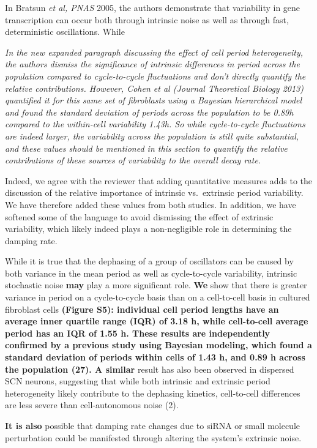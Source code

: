 \documentclass[11pt, letterpaper]{article}
\newenvironment{reviewer}{\itshape\color{gray}}{}
\newenvironment{manuscript}[1]{\begin{center}\begin{tcolorbox}[colback=green!5!white,colframe=green!75!black,width=\textwidth,title={#1},breakable,fonttitle=\bfseries]}{\end{tcolorbox}\end{center}}
\begin{document}
In Bratsun {\itshape et al, PNAS} 2005, the authors demonstrate that variability in gene transcription can occur both through intrinsic noise as well as through fast, deterministic oscillations. While 

\begin{reviewer}
In the new expanded paragraph discussing the effect of cell period heterogeneity, the authors dismiss the significance of intrinsic differences in period across the population compared to cycle-to-cycle fluctuations and don't directly quantify the relative contributions. However, Cohen et al (Journal Theoretical Biology 2013) quantified it for this same set of fibroblasts using a Bayesian hierarchical model and found the standard deviation of periods across the population to be 0.89h compared to the within-cell variability 1.43h. So while cycle-to-cycle fluctuations are indeed larger, the variability across the population is still quite substantial, and these values should be mentioned in this section to quantify the relative contributions of these sources of variability to the overall decay rate.
\end{reviewer}

Indeed, we agree with the reviewer that adding quantitative measures adds to the discussion of the relative importance of intrinsic vs.\ extrinsic period variability. We have therefore added these values from both studies. In addition, we have softened some of the language to avoid dismissing the effect of extrinsic variability, which likely indeed plays a non-negligible role in determining the damping rate.

\begin{manuscript}{Page 6}
  While it is true that the dephasing of a group of oscillators can be caused by both variance in the mean period as well as cycle-to-cycle variability, intrinsic stochastic noise {\bf may} play a more significant role. 
{\bf We} show that there is greater variance in period on a cycle-to-cycle basis than on a cell-to-cell basis in cultured fibroblast cells {\bf (Figure S5): individual cell period lengths have an average inner quartile range (IQR) of 3.18 h, while cell-to-cell average period has an IQR of 1.55 h. 
These results are independently confirmed by a previous study using Bayesian modeling, which found a standard deviation of periods within cells of 1.43 h, and 0.89 h across the population (27). 
A similar} result has also been observed in dispersed SCN neurons, suggesting that while both intrinsic and extrinsic period heterogeneity likely contribute to the dephasing kinetics, cell-to-cell differences are less severe than cell-autonomous noise (2).

{\bf It is also} possible that damping rate changes due to siRNA or small molecule perturbation could be manifested through altering the system's extrinsic noise.

\end{manuscript}
\end{document}
